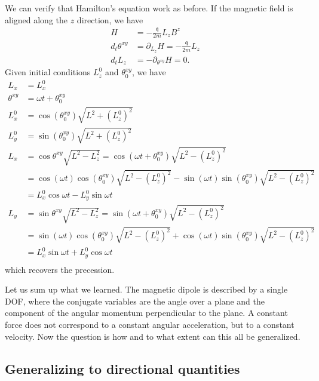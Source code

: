 We can verify that Hamilton's equation work as before. If the magnetic field is aligned along the $z$ direction, we have
\begin{equation}
	\begin{aligned}
		H &= - \frac{\mathfrak{q}}{2m} L_z B^z \\
		d_t \theta^{xy} &= \partial_{L_z} H = - \frac{\mathfrak{q}}{2m} L_z \\
		d_t L_z &= - \partial_{\theta^{xy}} H = 0.
	\end{aligned}
\end{equation}
Given initial conditions $L_z^0$ and $\theta^{xy}_0$, we have
\begin{equation}
	\begin{aligned}
		L_x &= L_x^0 \\
		\theta^{xy} &= \omega t + \theta^{xy}_0 \\
		L_x^0 &= \cos(\theta^{xy}_0)\sqrt{L^2 + (L_z^0)^2} \\
		L_y^0 &= \sin(\theta^{xy}_0)\sqrt{L^2 + (L_z^0)^2} \\
		L_x &= \cos\theta^{xy} \sqrt{L^2 - L_z^2} = \cos(\omega t + \theta^{xy}_0) \sqrt{L^2 - (L_z^0)^2} \\
		&= \cos(\omega t)\cos(\theta^{xy}_0) \sqrt{L^2 - (L_z^0)^2} - \sin(\omega t)\sin(\theta^{xy}_0) \sqrt{L^2 - (L_z^0)^2} \\
		&= L_x^0 \cos \omega t - L_y^0 \sin \omega t \\
		L_y &= \sin\theta^{xy} \sqrt{L^2 - L_z^2} = \sin(\omega t + \theta^{xy}_0) \sqrt{L^2 - (L_z^0)^2} \\
		&= \sin(\omega t)\cos(\theta^{xy}_0) \sqrt{L^2 - (L_z^0)^2} + \cos(\omega t)\sin(\theta^{xy}_0) \sqrt{L^2 - (L_z^0)^2} \\
		&= L_x^0 \sin \omega t + L_y^0 \cos \omega t \\
	\end{aligned}
\end{equation}
which recovers the precession.

Let us sum up what we learned. The magnetic dipole is described by a single DOF, where the conjugate variables are the angle over a plane and the component of the angular momentum perpendicular to the plane. A constant force does not correspond to a constant angular acceleration, but to a constant velocity. Now the question is how and to what extent can this all be generalized.


\subsection{Generalizing to directional quantities}

